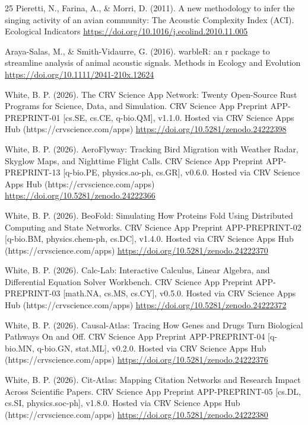 \documentclass[10pt,letterpaper]{article}
\begin{document}
\begin{thebibliography}{25}
 Pieretti, N., Farina, A., \& Morri, D. (2011). A new methodology to infer the singing activity of an avian community: The Acoustic Complexity Index (ACI). Ecological Indicators \url{https://doi.org/10.1016/j.ecolind.2010.11.005}

 Araya-Salas, M., \& Smith-Vidaurre, G. (2016). warbleR: an r package to streamline analysis of animal acoustic signals. Methods in Ecology and Evolution \url{https://doi.org/10.1111/2041-210x.12624}

 White, B. P. (2026). The CRV Science App Network: Twenty Open-Source Rust Programs for Science, Data, and Simulation. CRV Science App Preprint APP-PREPRINT-01 [cs.SE, cs.CE, q-bio.QM], v1.1.0. Hosted via CRV Science Apps Hub (https://crvscience.com/apps) \url{https://doi.org/10.5281/zenodo.24222398}

 White, B. P. (2026). AeroFlyway: Tracking Bird Migration with Weather Radar, Skyglow Maps, and Nighttime Flight Calls. CRV Science App Preprint APP-PREPRINT-13 [q-bio.PE, physics.ao-ph, cs.GR], v0.6.0. Hosted via CRV Science Apps Hub (https://crvscience.com/apps) \url{https://doi.org/10.5281/zenodo.24222366}

 White, B. P. (2026). BeoFold: Simulating How Proteins Fold Using Distributed Computing and State Networks. CRV Science App Preprint APP-PREPRINT-02 [q-bio.BM, physics.chem-ph, cs.DC], v1.4.0. Hosted via CRV Science Apps Hub (https://crvscience.com/apps) \url{https://doi.org/10.5281/zenodo.24222370}

 White, B. P. (2026). Calc-Lab: Interactive Calculus, Linear Algebra, and Differential Equation Solver Workbench. CRV Science App Preprint APP-PREPRINT-03 [math.NA, cs.MS, cs.CY], v0.5.0. Hosted via CRV Science Apps Hub (https://crvscience.com/apps) \url{https://doi.org/10.5281/zenodo.24222372}

 White, B. P. (2026). Causal-Atlas: Tracing How Genes and Drugs Turn Biological Pathways On and Off. CRV Science App Preprint APP-PREPRINT-04 [q-bio.MN, q-bio.GN, stat.ML], v0.2.0. Hosted via CRV Science Apps Hub (https://crvscience.com/apps) \url{https://doi.org/10.5281/zenodo.24222376}

 White, B. P. (2026). Cit-Atlas: Mapping Citation Networks and Research Impact Across Scientific Papers. CRV Science App Preprint APP-PREPRINT-05 [cs.DL, cs.SI, physics.soc-ph], v1.8.0. Hosted via CRV Science Apps Hub (https://crvscience.com/apps) \url{https://doi.org/10.5281/zenodo.24222380}


\end{thebibliography}
\end{document}
